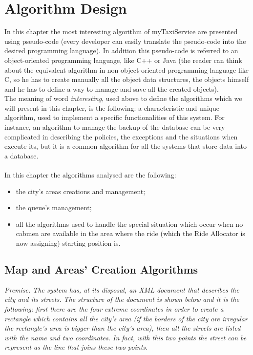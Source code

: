 \documentclass[\mainpath/main]{subfiles}
\begin{document}
\chapter{Algorithm Design}
\label{algorithm_design}

\setmyfancystyle

In this chapter the most interesting algorithm of myTaxiService are presented using pseudo-code (every developer can easily translate the pseudo-code into the desired programming language). In addition this pseudo-code is referred to an object-oriented programming language, like C++ or Java (the reader can think about the equivalent algorithm in non object-oriented programming language like C, so he has to create manually all the object data structures, the objects himself and he has to define a way to manage and save all the created objects).\\
The meaning of word \textit{interesting}, used above to define the algorithms which we will present in this chapter, is the following: a characteristic and unique algorithm, used to implement a specific functionalities of this system. For instance, an algorithm to manage the backup of the database can be very complicated in describing the policies, the exceptions and the situations when execute its, but it is a common algorithm for all the systems that store data into a database.\\
\\
In this chapter the algorithms analysed are the following:
\begin{itemize}
	\item the city's areas creations and management;
	\item the queue's management;
	\item all the algorithms used to handle the special situation which occur when no cabmen are available in the area where the ride (which the Ride Allocator is now assigning) starting position is.\\
\end{itemize}

\section{Map and Areas' Creation Algorithms}
\label{AlgorithmDesign:MapAreaAlgorithms}

\textit{Premise. The system has, at its disposal, an XML document that describes the city and its streets. The structure of the document is shown below and it is the following: first there are the four extreme coordinates in order to create a rectangle which contains all the city's area (if the borders of the city are irregular the rectangle's area is bigger than the city's area), then all the streets are listed with the name and two coordinates. In fact, with this two points the street can be represent as the line that joins these two points.}
\end{document}
